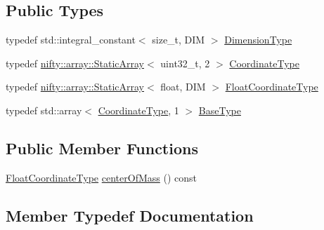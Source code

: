 \subsection*{Public Types}
\begin{DoxyCompactItemize}
\item 
typedef std\+::integral\+\_\+constant$<$ size\+\_\+t, D\+I\+M $>$ \hyperlink{classnifty_1_1cgp_1_1CellGeometry_3_01DIM_00_010_01_4_a71116d45ef5d2db3ccf29b0258df02ed}{Dimension\+Type}
\item 
typedef \hyperlink{namespacenifty_1_1array_a683f151f19c851754e0c6d55ed16a0c2}{nifty\+::array\+::\+Static\+Array}$<$ uint32\+\_\+t, 2 $>$ \hyperlink{classnifty_1_1cgp_1_1CellGeometry_3_01DIM_00_010_01_4_a3c8cec60edc558f44940e98135a521f0}{Coordinate\+Type}
\item 
typedef \hyperlink{namespacenifty_1_1array_a683f151f19c851754e0c6d55ed16a0c2}{nifty\+::array\+::\+Static\+Array}$<$ float, D\+I\+M $>$ \hyperlink{classnifty_1_1cgp_1_1CellGeometry_3_01DIM_00_010_01_4_a825cfc0d2e082ccd4b34e5ab2046dbe6}{Float\+Coordinate\+Type}
\item 
typedef std\+::array$<$ \hyperlink{classnifty_1_1cgp_1_1CellGeometry_3_01DIM_00_010_01_4_a3c8cec60edc558f44940e98135a521f0}{Coordinate\+Type}, 1 $>$ \hyperlink{classnifty_1_1cgp_1_1CellGeometry_3_01DIM_00_010_01_4_a299d8c228b7529d2e95f90aa3b2f7528}{Base\+Type}
\end{DoxyCompactItemize}
\subsection*{Public Member Functions}
\begin{DoxyCompactItemize}
\item 
\hyperlink{classnifty_1_1cgp_1_1CellGeometry_3_01DIM_00_010_01_4_a825cfc0d2e082ccd4b34e5ab2046dbe6}{Float\+Coordinate\+Type} \hyperlink{classnifty_1_1cgp_1_1CellGeometry_3_01DIM_00_010_01_4_ac76ee365e72874db3e3a541c20f7f462}{center\+Of\+Mass} () const 
\end{DoxyCompactItemize}


\subsection{Member Typedef Documentation}
\hypertarget{classnifty_1_1cgp_1_1CellGeometry_3_01DIM_00_010_01_4_a299d8c228b7529d2e95f90aa3b2f7528}{}
